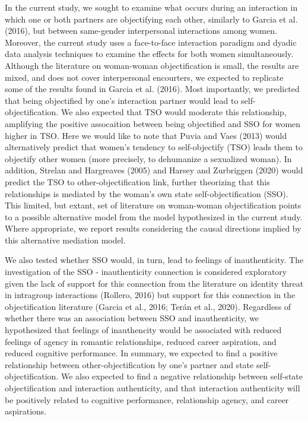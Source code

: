 \documentclass[man]{apa6}
\begin{document}
In the current study, we sought to examine what occurs during an
interaction in which one or both partners are objectifying each other,
similarly to Garcia et al. (2016), but between same-gender interpersonal
interactions among women. Moreover, the current study uses a
face-to-face interaction paradigm and dyadic data analysis techniques to
examine the effects for both women simultaneously. Although the
literature on woman-woman objectification is small, the results are
mixed, and does not cover interpersonal encourters, we expected to
replicate some of the results found in Garcia et al. (2016). Most
importantly, we predicted that being objectified by one's interaction
partner would lead to self-objectification. We also expected that TSO
would moderate this relationship, amplifying the positive assocaition
between being objectified and SSO for women higher in TSO. Here we would
like to note that Puvia and Vaes (2013) would alternatively predict that
women's tendency to self-objectify (TSO) leads them to objectify other
women (more precisely, to dehumanize a sexualized woman). In addition,
Strelan and Hargreaves (2005) and Harsey and Zurbriggen (2020) would
predict the TSO to other-objectification link, further theorizing that
this relationships is mediated by the woman's own state
self-objectification (SSO). This limited, but extant, set of literature
on woman-woman objectification points to a possible alternative model
from the model hypothesized in the current study. Where appropriate, we
report results considering the causal directions implied by this
alternative mediation model.

We also tested whether SSO would, in turn, lead to feelings of
inauthenticity. The investigation of the SSO - inauthenticity connection
is considered exploratory given the lack of support for this connection
from the literature on identity threat in intragroup interactions
(Rollero, 2016) but support for this connection in the objectification
literature (Garcia et al., 2016; Terán et al., 2020). Regardless of
whether there was an association between SSO and inauthenticity, we
hypothesized that feelings of inauthencity would be associated with
reduced feelings of agency in romantic relationships, reduced career
aspiration, and reduced cognitive performance. In summary, we expected
to find a positive relationship between other-objectification by one's
partner and state self-objectification. We also expected to find a
negative relationship between self-state objectification and interaction
authenticity, and that interaction authenticity will be positively
related to cognitive performance, relationship agency, and career
aspirations.
\end{document}
